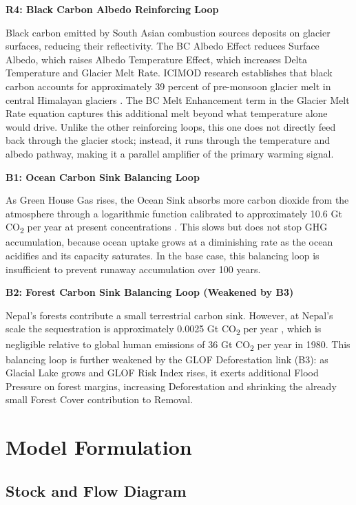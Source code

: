 \documentclass[12pt, a4paper]{article}
\begin{document}
\textbf{R4: Black Carbon Albedo Reinforcing Loop}

Black carbon emitted by South Asian combustion sources deposits on glacier surfaces, reducing their reflectivity. The BC Albedo Effect reduces Surface Albedo, which raises Albedo Temperature Effect, which increases Delta Temperature and Glacier Melt Rate. ICIMOD research establishes that black carbon accounts for approximately 39 percent of pre-monsoon glacier melt in central Himalayan glaciers \cite{icimod2021}. The BC Melt Enhancement term in the Glacier Melt Rate equation captures this additional melt beyond what temperature alone would drive. Unlike the other reinforcing loops, this one does not directly feed back through the glacier stock; instead, it runs through the temperature and albedo pathway, making it a parallel amplifier of the primary warming signal.

\textbf{B1: Ocean Carbon Sink Balancing Loop}

As Green House Gas rises, the Ocean Sink absorbs more carbon dioxide from the atmosphere through a logarithmic function calibrated to approximately 10.6 Gt CO\textsubscript{2} per year at present concentrations \cite{friedlingstein2022}. This slows but does not stop GHG accumulation, because ocean uptake grows at a diminishing rate as the ocean acidifies and its capacity saturates. In the base case, this balancing loop is insufficient to prevent runaway accumulation over 100 years.

\textbf{B2: Forest Carbon Sink Balancing Loop (Weakened by B3)}

Nepal's forests contribute a small terrestrial carbon sink. However, at Nepal's scale the sequestration is approximately 0.0025 Gt CO\textsubscript{2} per year \cite{pmc2024}, which is negligible relative to global human emissions of 36 Gt CO\textsubscript{2} per year in 1980. This balancing loop is further weakened by the GLOF Deforestation link (B3): as Glacial Lake grows and GLOF Risk Index rises, it exerts additional Flood Pressure on forest margins, increasing Deforestation and shrinking the already small Forest Cover contribution to Removal.

\section{Model Formulation}

\subsection{Stock and Flow Diagram}
\end{document}
